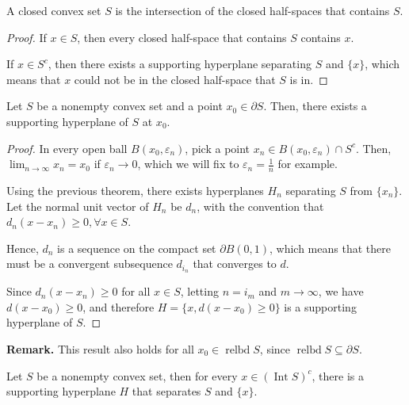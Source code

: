 \begin{corollary}
\label{cor:Closed convex sets are intersection of closed half-spaces}
  A closed convex set \( S \) is the intersection of the closed half-spaces that
  contains \( S \).
\end{corollary}

\begin{proof}
  If \( x \in S \), then every closed half-space that contains \( S \) contains
  \( x \).

  If \( x \in S^{c} \), then there exists a supporting hyperplane separating \(
  S\) and \( \{x\}   \), which means that \( x \) could not be in the closed
  half-space that \( S \) is in.
\end{proof}


\begin{theorem}
  \label{thr:Supporting Hyperplane Theorem}
  Let \( S \) be a nonempty convex set and a point \( x_{0} \in \partial S \).
  Then, there exists a supporting hyperplane of \( S \) at \( x_{0} \).
\end{theorem}

\begin{proof}
  In every open ball \( B(x_{0}, \varepsilon_{n}) \), pick a point \( x_{n} \in
  B(x_{0}, \varepsilon_{n}) \cap  S^{c}\). Then, \( \lim_{n \to \infty} x_{n} =
  x_{0}\) if \( \varepsilon_{n} \to  0 \), which we will fix to \( \varepsilon_{n}
  = \frac{1}{n}\) for example.

  Using the previous theorem, there exists hyperplanes \( H_{n} \) separating \(
  S\) from \( \{x_{n}\}   \). Let the normal unit vector of \( H_{n} \) be \(
  d_{n} \), with the convention that \( d_{n}(x-x_{n}) \ge 0, \forall  x \in
  S \).

  Hence, \( d_{n} \) is a sequence on the compact set \( \partial B(0, 1) \),
  which means that there must be a convergent subsequence \( d_{i_{n}} \) that
  converges to \( d \).

  Since \( d_{n}(x-x_{n}) \ge 0 \) for all \( x \in S \), letting \( n = i_{m}
  \) and \( m \to  \infty \), we have \( d(x-x_{0}) \ge 0 \), and therefore \(
  H=\{x, d(x-x_{0})\ge 0\}   \) is a supporting hyperplane of \( S \).
\end{proof}

\textbf{Remark. } This result also holds for all \( x_{0} \in
\operatorname{relbd} S
\), since \( \operatorname{relbd} S \subseteq \partial S \).

\begin{corollary}
\label{cor:hst-set-pt}
  Let \( S \) be a nonempty convex set, then for every \( x \in
  (\operatorname{Int} S)^{c} \), there is a supporting hyperplane \( H \) that
  separates \( S \) and \( \{ x\}   \).
\end{corollary}

